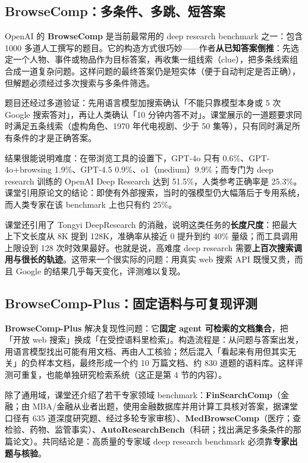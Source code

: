 \documentclass[a4paper]{article}
\begin{document}
\subsection{BrowseComp：多条件、多跳、短答案}

OpenAI 的 \textbf{BrowseComp} 是当前最常用的 deep research benchmark 之一：包含 1000 多道人工撰写的题目。它的构造方式很巧妙——作者\textbf{从已知答案倒推}：先选定一个人物、事件或物品作为目标答案，再收集一组线索（clue），把多条线索组合成一道复杂问题。这样问题的最终答案仍是短实体（便于自动判定是否正确），但解题必须经过多次搜索与多条件筛选。

题目还经过多道验证：先用语言模型加搜索确认「不能只靠模型本身或 5 次 Google 搜索答对」，再让人类确认「10 分钟内答不对」。课堂展示的一道题要求同时满足五条线索（虚构角色、1970 年代电视剧、少于 50 集等），只有同时满足所有条件的才是正确答案。

结果很能说明难度：在带浏览工具的设置下，GPT-4o 只有 0.6\%、GPT-4o+browsing 1.9\%、GPT-4.5 0.9\%、o1（medium）9.9\%；而专门为 deep research 训练的 OpenAI Deep Research 达到 51.5\%，人类参考正确率是 25.3\%。课堂引用原论文的结论：即使有外部搜索，当时的强模型仍大幅落后于专用系统，而人类专家在该 benchmark 上也只有约 25\%。

课堂还引用了 Tongyi DeepResearch 的消融，说明这类任务的\textbf{长度尺度}：把最大上下文长度从 8K 提到 128K，准确率从接近 0 提升到约 40\% 量级；而工具调用上限设到 128 次时效果最好。也就是说，高难度 deep research 需要\textbf{上百次搜索调用与很长的轨迹}。这带来一个很实际的问题：用真实 web 搜索 API 既慢又贵，而且 Google 的结果几乎每天变化，评测难以复现。

\subsection{BrowseComp-Plus：固定语料与可复现评测}

\textbf{BrowseComp-Plus} 解决复现性问题：它\textbf{固定 agent 可检索的文档集合}，把「开放 web 搜索」换成「在受控语料里检索」。构造流程是：从问题与答案出发，用语言模型找出可能有用文档、再由人工核验；然后混入「看起来有用但其实无关」的负样本文档，最终形成一个约 10 万篇文档、约 830 道题的语料库。这样评测可重复，也能单独研究检索系统（这正是第 4 节的内容）。

除了通用域，课堂还介绍了若干专家领域 benchmark：\textbf{FinSearchComp}（金融；由 MBA/金融从业者出题，使用金融数据库并用计算工具核对答案，据课堂口径有 635 道深度研究题、经过多轮专家审核）、\textbf{MedBrowseComp}（医疗；查检验、药物、监管事实）、\textbf{AutoResearchBench}（科研；找出满足多条条件的那篇论文）。共同结论是：高质量的专家域 deep research benchmark 必须靠\textbf{专家出题与核验}。
\end{document}

